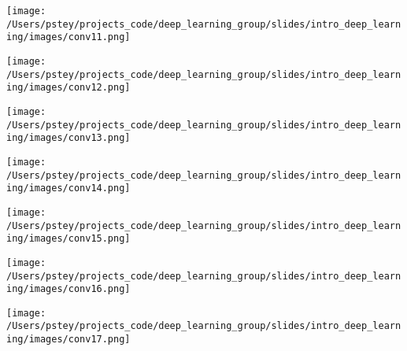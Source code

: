 \documentclass[pdf]{beamer}
\begin{document}
	\begin{frame}
	\begin{center}
		\texttt{[image: /Users/pstey/projects\_code/deep\_learning\_group/slides/intro\_deep\_learning/images/conv11.png]}
	\end{center}
	\end{frame}
		
	\begin{frame}
	\begin{center}
		\texttt{[image: /Users/pstey/projects\_code/deep\_learning\_group/slides/intro\_deep\_learning/images/conv12.png]}
	\end{center}
	\end{frame}

	\begin{frame}
	\begin{center}
		\texttt{[image: /Users/pstey/projects\_code/deep\_learning\_group/slides/intro\_deep\_learning/images/conv13.png]}
	\end{center}
	\end{frame}
	
	\begin{frame}
	\begin{center}
		\texttt{[image: /Users/pstey/projects\_code/deep\_learning\_group/slides/intro\_deep\_learning/images/conv14.png]}
	\end{center}
	\end{frame}
		
	\begin{frame}
	\begin{center}
		\texttt{[image: /Users/pstey/projects\_code/deep\_learning\_group/slides/intro\_deep\_learning/images/conv15.png]}
	\end{center}
	\end{frame}
		
	\begin{frame}
	\begin{center}
		\texttt{[image: /Users/pstey/projects\_code/deep\_learning\_group/slides/intro\_deep\_learning/images/conv16.png]}
	\end{center}
	\end{frame}

	\begin{frame}
	\begin{center}
		\texttt{[image: /Users/pstey/projects\_code/deep\_learning\_group/slides/intro\_deep\_learning/images/conv17.png]}
	\end{center}
	\end{frame}
		
\end{document}
